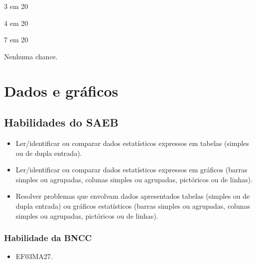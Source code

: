 \begin{escolha}
\item
3 em 20
\item
4 em 20
\item
7 em 20
\item
Nenhuma chance.
\end{escolha}

\chapter{Dados e gráficos}

\section*{Habilidades do SAEB}

\begin{itemize}
\item Ler/identificar ou comparar dados estatísticos expressos em tabelas
(simples ou de dupla entrada).

\item Ler/identificar ou comparar dados estatísticos expressos em gráficos
(barras simples ou agrupadas, colunas simples ou agrupadas, pictóricos
ou de linhas).

\item Resolver problemas que envolvam dados apresentados tabelas (simples ou
de dupla entrada) ou gráficos estatísticos (barras simples ou agrupadas,
colunas simples ou agrupadas, pictóricos ou de linhas).
\end{itemize}

\subsection{Habilidade da BNCC}

\begin{itemize}
  \item 
 EF03MA27.
\end{itemize}

